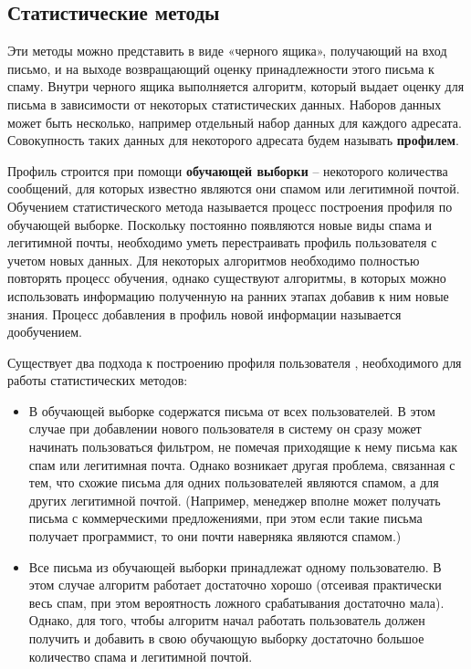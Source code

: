 \subsection{Статистические методы}

Эти методы можно представить в виде «черного ящика», получающий на вход письмо, и на выходе возвращающий оценку принадлежности этого письма к спаму. Внутри черного ящика выполняется алгоритм, который выдает оценку для письма в зависимости от некоторых статистических данных. Наборов данных может быть несколько, например отдельный набор данных для каждого адресата. Совокупность таких данных для некоторого адресата будем называть \textbf{профилем}.

Профиль строится  при помощи \textbf{обучающей выборки} – некоторого количества сообщений, для которых известно являются они спамом или легитимной почтой. Обучением статистического метода называется процесс построения профиля по обучающей выборке. Поскольку постоянно появляются новые виды спама и легитимной почты, необходимо уметь перестраивать профиль пользователя с учетом новых данных. Для некоторых алгоритмов необходимо полностью повторять процесс обучения, однако существуют алгоритмы, в которых можно использовать информацию полученную на ранних этапах добавив к ним новые знания. Процесс добавления в профиль новой информации называется дообучением.

Существует два подхода к построению профиля пользователя , необходимого для работы статистических методов:

\begin{itemize}
\item В обучающей выборке содержатся письма от всех пользователей. В этом случае при добавлении нового пользователя в систему он сразу может начинать пользоваться фильтром, не помечая приходящие к нему письма как спам или  легитимная почта. Однако возникает другая проблема, связанная с тем, что схожие письма для одних пользователей являются спамом, а для других легитимной почтой. (Например, менеджер вполне может получать письма с коммерческими предложениями, при этом если такие письма получает программист, то они почти наверняка являются спамом.)
\item Все письма из обучающей выборки принадлежат одному пользователю. В этом случае алгоритм работает достаточно хорошо (отсеивая практически весь спам, при этом вероятность ложного срабатывания достаточно мала). Однако, для того, чтобы алгоритм начал работать пользователь должен получить и добавить в свою обучающую выборку достаточно большое количество спама и легитимной почтой.
\end{itemize}


